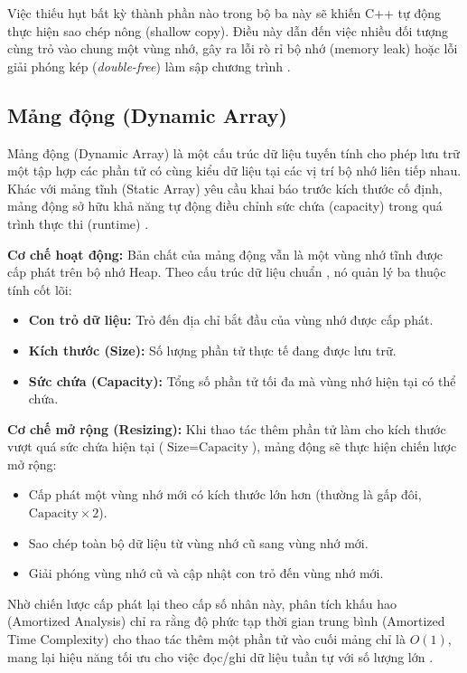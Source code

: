 \documentclass{report}
\begin{document}
Việc thiếu hụt bất kỳ thành phần nào trong bộ ba này sẽ khiến C++ tự động thực hiện sao chép nông (shallow copy). Điều này dẫn đến việc nhiều đối tượng cùng trỏ vào chung một vùng nhớ, gây ra lỗi rò rỉ bộ nhớ (memory leak) hoặc lỗi giải phóng kép (\textit{double-free}) làm sập chương trình \cite{cppcoreguidelines}.

\subsection{Mảng động (Dynamic Array)}

Mảng động (Dynamic Array) là một cấu trúc dữ liệu tuyến tính cho phép lưu trữ một tập hợp các phần tử có cùng kiểu dữ liệu tại các vị trí bộ nhớ liên tiếp nhau. Khác với mảng tĩnh (Static Array) yêu cầu khai báo trước kích thước cố định, mảng động sở hữu khả năng tự động điều chỉnh sức chứa (capacity) trong quá trình thực thi (runtime) \cite{weiss2013}.

\textbf{Cơ chế hoạt động:} Bản chất của mảng động vẫn là một vùng nhớ tĩnh được cấp phát trên bộ nhớ Heap. Theo cấu trúc dữ liệu chuẩn \cite{weiss2013}, nó quản lý ba thuộc tính cốt lõi:
\begin{itemize}
    \item \textbf{Con trỏ dữ liệu:} Trỏ đến địa chỉ bắt đầu của vùng nhớ được cấp phát.
    \item \textbf{Kích thước (Size):} Số lượng phần tử thực tế đang được lưu trữ.
    \item \textbf{Sức chứa (Capacity):} Tổng số phần tử tối đa mà vùng nhớ hiện tại có thể chứa.
\end{itemize}

\textbf{Cơ chế mở rộng (Resizing):} Khi thao tác thêm phần tử làm cho kích thước vượt quá sức chứa hiện tại ($\text{Size} = \text{Capacity}$), mảng động sẽ thực hiện chiến lược mở rộng:
\begin{itemize}
    \item Cấp phát một vùng nhớ mới có kích thước lớn hơn (thường là gấp đôi, $\text{Capacity} \times 2$).
    \item Sao chép toàn bộ dữ liệu từ vùng nhớ cũ sang vùng nhớ mới.
    \item Giải phóng vùng nhớ cũ và cập nhật con trỏ đến vùng nhớ mới.
\end{itemize}

Nhờ chiến lược cấp phát lại theo cấp số nhân này, phân tích khấu hao (Amortized Analysis) chỉ ra rằng độ phức tạp thời gian trung bình (Amortized Time Complexity) cho thao tác thêm một phần tử vào cuối mảng chỉ là $O(1)$, mang lại hiệu năng tối ưu cho việc đọc/ghi dữ liệu tuần tự với số lượng lớn \cite{weiss2013}.
\end{document}
